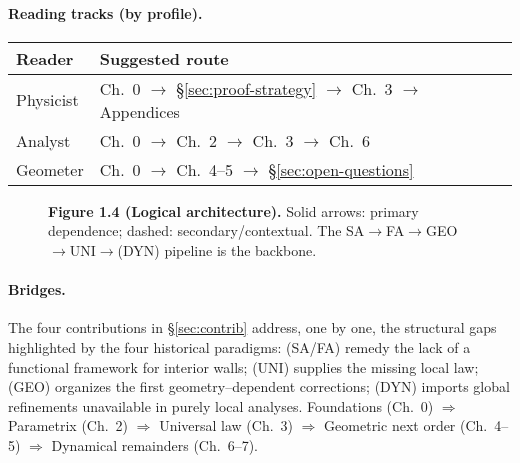 \paragraph{Reading tracks (by profile).}
\begin{center}
\begin{tabular}{|l|l|}
\hline
\textbf{Reader} & \textbf{Suggested route} \\
\hline
Physicist & Ch.~0 $\to$ §\ref{sec:proof-strategy} $\to$ Ch.~3 $\to$ Appendices \\
Analyst & Ch.~0 $\to$ Ch.~2 $\to$ Ch.~3 $\to$ Ch.~6 \\
Geometer & Ch.~0 $\to$ Ch.~4–5 $\to$ §\ref{sec:open-questions} \\
\hline
\end{tabular}
\end{center}

\begin{figure}[t]
\centering
{}
\caption{\textbf{Figure 1.4 (Logical architecture).} Solid arrows: primary dependence; dashed: secondary/contextual. The SA$\to$FA$\to$GEO$\to$UNI$\to$(DYN) pipeline is the backbone.}
\label{fig:monograph-structure}
\end{figure}

\paragraph{Bridges.}
The four contributions in §\ref{sec:contrib} address, one by one, the structural gaps highlighted by the four historical paradigms: (SA/FA) remedy the lack of a functional framework for interior walls; (UNI) supplies the missing local law; (GEO) organizes the first geometry–dependent corrections; (DYN) imports global refinements unavailable in purely local analyses.
Foundations (Ch.~0) $\Rightarrow$ Parametrix (Ch.~2) $\Rightarrow$ Universal law (Ch.~3) $\Rightarrow$ Geometric next order (Ch.~4–5) $\Rightarrow$ Dynamical remainders (Ch.~6–7).

